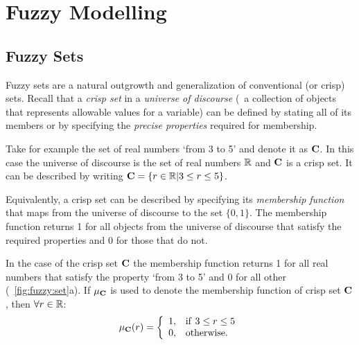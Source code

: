 \graphicspath{{img/}}





\chapter{Fuzzy Modelling}
\label{chap:fuzzyModelling}


\section{Fuzzy Sets}
\label{sec:fuzzyModelling:fuzzySets}
Fuzzy sets are a natural outgrowth and generalization of conventional (or crisp) sets. Recall that a \emph{crisp set} in a \emph{universe of discourse} (\ie\ a collection of objects that represents allowable values for a variable) can be defined by stating all of its members or by specifying the \emph{precise properties} required for membership. 

Take for example the set of real numbers `from 3 to 5' and denote it as ${\mathbf{C}}$. In this case the universe of discourse is the set of real numbers $\mathbb{R}$ and ${\mathbf{C}}$ is a crisp set. It can be described by writing ${\mathbf{C}}=\{r \in \mathbb{R}| 3 \leq r \leq 5\}$. 

Equivalently, a crisp set can be described by specifying its \emph{membership function} that maps from the universe of discourse to the set $\{0,1\}$. The membership function returns 1 for all objects from the universe of discourse that satisfy the required properties and 0 for those that do not. 

In the case of the crisp set ${\mathbf{C}}$ the membership function returns 1 for all real numbers that satisfy the property `from 3 to 5' and 0 for all other (\fig~\ref{fig:fuzzy:set}a). If $\mu_{\mathbf{C}}$ is used to denote the membership function of crisp set ${\mathbf{C}}$, then $\forall r \in \mathbb{R}$:
%
\begin{equation}
\mu_{\mathbf{C}}(r)=\left\{
 \begin{array}{ll}
   1, & \mathrm{if\ }3 \leq r \leq 5 \\
   0, & \mathrm{otherwise}.
 \end{array}
\right.
\end{equation}

